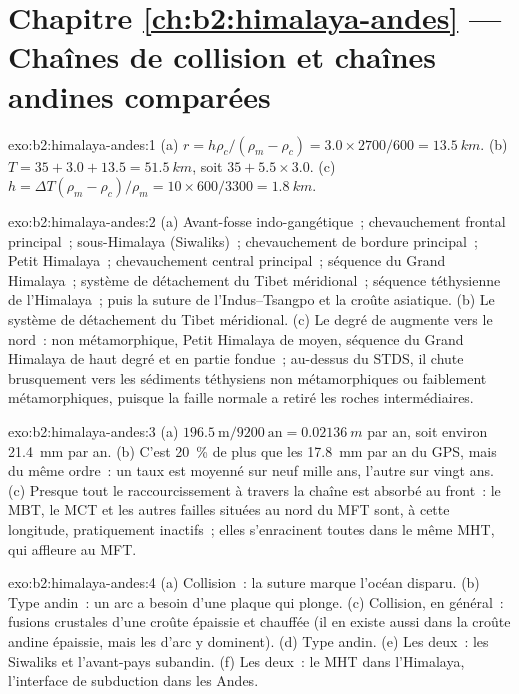 \section*{Chapitre \ref{ch:b2:himalaya-andes} --- Chaînes de collision et chaînes andines comparées}

\begin{solution}{exo:b2:himalaya-andes:1}
(a) $r = h\rho_c/(\rho_m - \rho_c) = 3.0\times2700/600 = \qty{13.5}{km}$. (b) $T = 35 + 3.0 +
13.5 = \qty{51.5}{km}$, soit $35 + 5.5\times3.0$. (c) $h = \Delta T(\rho_m - \rho_c)/\rho_m =
10\times600/3300 = \qty{1.8}{km}$.
\end{solution}

\begin{solution}{exo:b2:himalaya-andes:2}
(a) Avant-fosse indo-gangétique~; chevauchement frontal principal~; sous-Himalaya (Siwaliks)~; chevauchement de
bordure principal~; Petit Himalaya~; chevauchement central principal~; séquence du Grand Himalaya~; système
de détachement du Tibet méridional~; séquence téthysienne de l'Himalaya~; puis la suture de l'Indus--Tsangpo
et la croûte asiatique. (b) Le système de détachement du Tibet méridional. (c) Le degré de  augmente
vers le nord~:  non métamorphique, Petit Himalaya de  moyen, séquence du Grand Himalaya
de haut degré et en partie fondue~; au-dessus du STDS, il chute brusquement vers les sédiments téthysiens
non métamorphiques ou faiblement métamorphiques, puisque la faille normale a retiré les roches intermédiaires.
\end{solution}

\begin{solution}{exo:b2:himalaya-andes:3}
(a) $196.5\ \text{m}/9200\ \text{an} = \qty{0.02136}{m}$ par an, soit environ \qty{21.4}{mm}
par an. (b) C'est \qty{20}{\percent} de plus que les \qty{17.8}{mm} par an du
GPS, mais du même ordre~: un taux est moyenné sur neuf mille ans, l'autre sur vingt
ans. (c) Presque tout le raccourcissement à travers la chaîne est absorbé au front~: le
MBT, le MCT et les autres failles situées au nord du MFT sont, à cette longitude,
pratiquement inactifs~; elles s'enracinent toutes dans le même MHT, qui affleure au MFT.
\end{solution}

\begin{solution}{exo:b2:himalaya-andes:4}
(a) Collision~: la suture marque l'océan disparu. (b) Type andin~: un arc a besoin
d'une plaque qui plonge. (c) Collision, en général~: fusions crustales d'une croûte
épaissie et chauffée (il en existe aussi dans la croûte andine épaissie, mais les 
d'arc y dominent). (d) Type andin. (e) Les deux~: les Siwaliks et l'avant-pays subandin.
(f) Les deux~: le MHT dans l'Himalaya, l'interface de subduction dans les Andes.
\end{solution}

